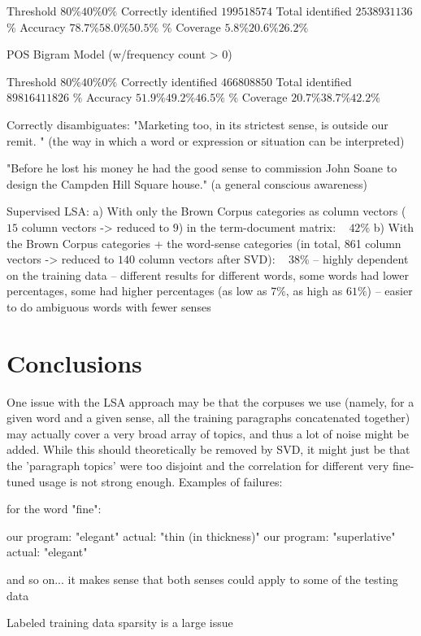 \documentclass[10pt, letterpaper]{article}
\begin{document}
	Threshold	$80\%	40\%	0\%$
	Correctly identified	$199	518	574$
	Total identified	$253	893	1136$
	$\%$ Accuracy	$78.7\%	58.0\%	50.5\%$
	$\%$ Coverage	$5.8\%	20.6\%	26.2\%$

	POS Bigram Model (w/frequency count > 0)

	Threshold	$80\%	40\%	0\%$
	Correctly identified	$466	808	850$
	Total identified	$898	1641	1826$
	$\%$ Accuracy	$51.9\%	49.2\%	46.5\%$
	$\%$ Coverage	$20.7\%	38.7\%	42.2\%$

	Correctly disambiguates:
	"Marketing too, in its strictest sense, is outside our remit. " (the way in which a word or expression or situation can be interpreted)	

	"Before he lost his money he had the good sense to commission John Soane to design the Campden Hill Square house." (a general conscious awareness)

	Supervised LSA: 
	a) With only the Brown Corpus categories as column vectors ($15$ column vectors -> reduced to $9$) in the term-document matrix: ~ $42\%$
	b) With the Brown Corpus categories + the word-sense categories (in total, 861 column vectors -> reduced to $140$ column vectors after SVD): ~ $38\%$
	-- highly dependent on the training data -- different results for different words, some words had lower percentages, some had higher percentages (as low as $7\%$, as high as $61\%$)
	-- easier to do ambiguous words with fewer senses

	\section{Conclusions}
	One issue with the LSA approach may be that the corpuses we use (namely, for a given word and a given sense, all the training paragraphs concatenated together) may actually cover a very broad array of topics, and thus a lot of noise might be added. While this should theoretically be removed by SVD, it might just be that the 'paragraph topics' were too disjoint and the correlation for different very fine-tuned usage is not strong enough. 
	Examples of failures: 

	for the word "fine": 	

	our program: "elegant"  actual: "thin (in thickness)"
	our program: "superlative" actual: "elegant" 	

	and so on... it makes sense that both senses could apply to some of the testing data

	Labeled training data sparsity is a large issue
\end{document}
